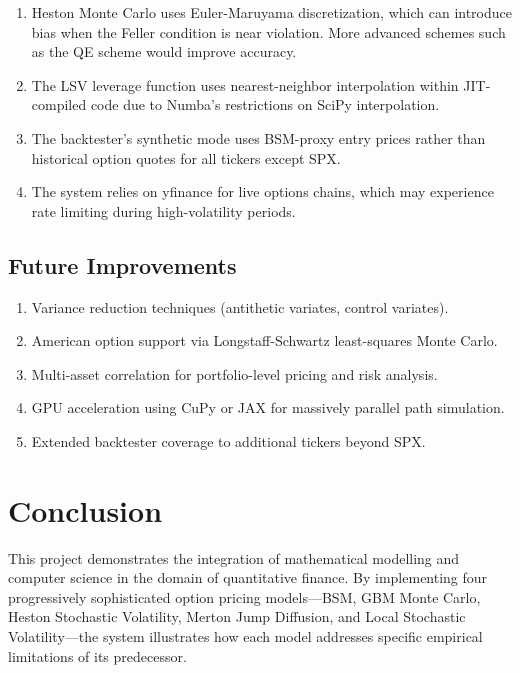 \documentclass[12pt,a4paper]{article}
\begin{document}
\begin{enumerate}
\item Heston Monte Carlo uses Euler-Maruyama discretization, which can introduce bias when the Feller condition is near violation. More advanced schemes such as the QE scheme \parencite{andersen2008} would improve accuracy.
\item The LSV leverage function uses nearest-neighbor interpolation within JIT-compiled code due to Numba's restrictions on SciPy interpolation.
\item The backtester's synthetic mode uses BSM-proxy entry prices rather than historical option quotes for all tickers except SPX.
\item The system relies on yfinance for live options chains, which may experience rate limiting during high-volatility periods.
\end{enumerate}

\subsection{Future Improvements}

\begin{enumerate}
\item Variance reduction techniques (antithetic variates, control variates).
\item American option support via Longstaff-Schwartz least-squares Monte Carlo.
\item Multi-asset correlation for portfolio-level pricing and risk analysis.
\item GPU acceleration using CuPy or JAX for massively parallel path simulation.
\item Extended backtester coverage to additional tickers beyond SPX.
\end{enumerate}

\section{Conclusion}

This project demonstrates the integration of mathematical modelling and computer science in the domain of quantitative finance. By implementing four progressively sophisticated option pricing models---BSM, GBM Monte Carlo, Heston Stochastic Volatility, Merton Jump Diffusion, and Local Stochastic Volatility---the system illustrates how each model addresses specific empirical limitations of its predecessor.
\end{document}
